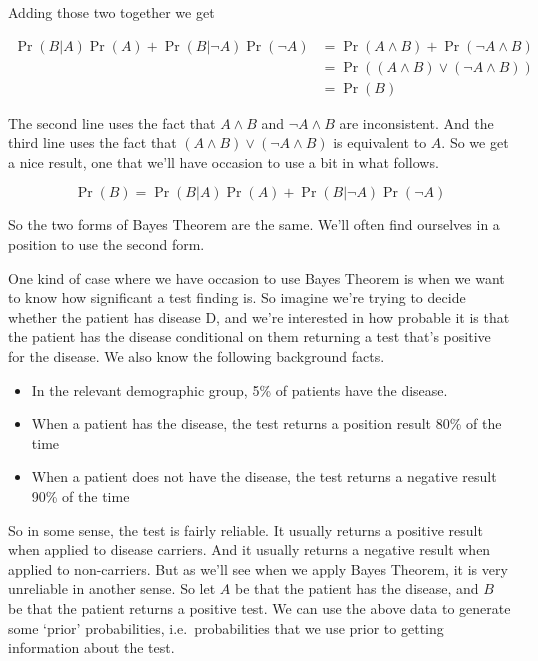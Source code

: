 \documentclass[
  11pt,
  letterpaper,
]{scrbook}
\providecommand{\tightlist}{%
  \setlength{\itemsep}{0pt}\setlength{\parskip}{0pt}}
\begin{document}
Adding those two together we get

\begin{align*}
\Pr(B|A)\Pr(A) + \Pr(B|\neg A)\Pr(\neg A) &= \Pr(A \wedge B) + \Pr(\neg A \wedge B) \\
&= \Pr((A \wedge B) \vee (\neg A \wedge B)) \\
&= \Pr(B)
\end{align*}

The second line uses the fact that \(A \wedge B\) and
\(\neg A \wedge B\) are inconsistent. And the third line uses the fact
that \((A \wedge B) \vee (\neg A \wedge B)\) is equivalent to \(A\). So
we get a nice result, one that we'll have occasion to use a bit in what
follows.

\begin{equation*}
\Pr(B) = \Pr(B|A)\Pr(A) + \Pr(B|\neg A)\Pr(\neg A)
\end{equation*}

So the two forms of Bayes Theorem are the same. We'll often find
ourselves in a position to use the second form.

One kind of case where we have occasion to use Bayes Theorem is when we
want to know how significant a test finding is. So imagine we're trying
to decide whether the patient has disease D, and we're interested in how
probable it is that the patient has the disease conditional on them
returning a test that's positive for the disease. We also know the
following background facts.

\begin{itemize}
\tightlist
\item
  In the relevant demographic group, 5\% of patients have the disease.
\item
  When a patient has the disease, the test returns a position result
  80\% of the time
\item
  When a patient does not have the disease, the test returns a negative
  result 90\% of the time
\end{itemize}

So in some sense, the test is fairly reliable. It usually returns a
positive result when applied to disease carriers. And it usually returns
a negative result when applied to non-carriers. But as we'll see when we
apply Bayes Theorem, it is very unreliable in another sense. So let
\(A\) be that the patient has the disease, and \(B\) be that the patient
returns a positive test. We can use the above data to generate some
`prior' probabilities, i.e.~probabilities that we use prior to getting
information about the test.
\end{document}
